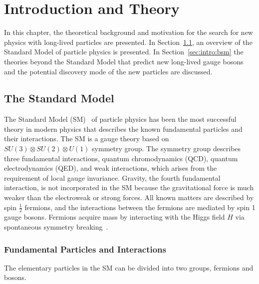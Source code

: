 \chapter{Introduction and Theory}
\label{chap:introduction}

In this chapter, the theoretical background and motivation for the search for new physics with long-lived particles are presented. In Section~\ref{sec:intro:standard_model}, an overview of the Standard Model of particle physics is presented. In Section~\ref{sec:intro:bsm} the theories beyond the Standard Model that predict new long-lived gauge bosons and the potential discovery mode of the new particles are discussed.



\section{The Standard Model}
\label{sec:intro:standard_model}

The Standard Model (SM)~\cite{Burgess:2007zi} of particle physics has been the most successful theory in modern physics that describes the known fundamental particles and their interactions. The SM is a gauge theory based on $SU(3) \otimes SU(2) \otimes U(1)$ symmetry group. The symmetry group describes three fundamental interactions, quantum chromodynamics (QCD), quantum electrodynamics (QED), and weak interactions, which arises from the requirement of local gauge invariance. Gravity, the fourth fundamental interaction, is not incorporated in the SM because the gravitational force is much weaker than the electroweak or strong forces. All known matters are described by spin $\frac{1}{2}$ fermions, and the interactions between the fermions are mediated by spin 1 gauge bosons. Fermions acquire mass by interacting with the Higgs field $H$ via spontaneous symmetry breaking~\cite{Higgs:1964pj}.

\subsection{Fundamental Particles and Interactions}
\label{sec:intro:fundamental_particles}
The elementary particles in the SM can be divided into two groups, fermions and bosons.

